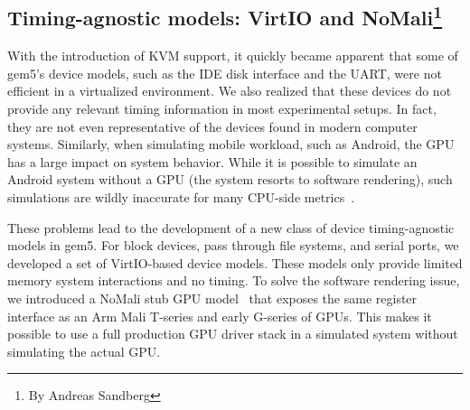 \subsection[Timing-agnostic models: VirtIO and NoMali]{Timing-agnostic models: VirtIO and NoMali\footnote{By Andreas Sandberg}}
\label{sec:virtio-nomali}

With the introduction of KVM support, it quickly became apparent that some of gem5's device models, such as the IDE disk interface and the UART, were not efficient in a virtualized environment.
We also realized that these devices do not provide any relevant timing information in most experimental setups.
In fact, they are not even representative of the devices found in modern computer systems.
Similarly, when simulating mobile workload, such as Android, the GPU has a large impact on system behavior.
While it is possible to simulate an Android system without a GPU (the system resorts to software rendering), such simulations are wildly inaccurate for many CPU-side metrics~\cite{nomali}.

These problems lead to the development of a new class of device timing-agnostic models in gem5.
For block devices, pass through file systems, and serial ports, we developed a set of VirtIO-based device models.
These models only provide limited memory system interactions and no timing.
To solve the software rendering issue, we introduced a NoMali stub GPU model~\cite{nomali} that exposes the same register interface as an Arm Mali T-series and early G-series of GPUs.
This makes it possible to use a full production GPU driver stack in a simulated system without simulating the actual GPU.
